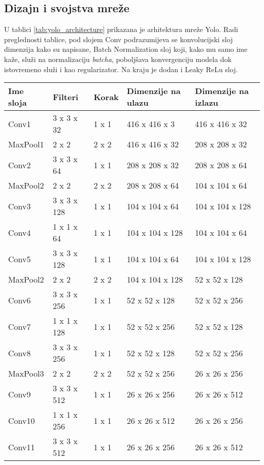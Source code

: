 \subsection{Dizajn i svojstva mreže}

U tablici \ref{tab:yolo_architecture} prikazana je arhitektura mreže Yolo. Radi preglednosti tablice, pod slojem Conv podrazumijeva se konvolucijski sloj dimenzija kako su napisane, Batch Normalization sloj koji, kako mu samo ime kaže, služi na normalizaciju \textit{batcha}, poboljšava konvergenciju modela dok istovremeno služi i kao regularizator. Na kraju je dodan i Leaky ReLu sloj.

\begin{minipage}{\linewidth}
\centering

\begin{tabular}{||l|l|l|l|l||}
\hline
	Ime sloja & Filteri & Korak & Dimenzije na ulazu & Dimenzije na izlazu \\
\hline
	Conv1 & 3 x 3 x 32 & 1 x 1 & 416 x 416 x   3 & 416 x 416 x  32 \\
\hline
	MaxPool1 & 2 x 2 & 2 x 2 & 416 x 416 x  32 & 208 x 208 x  32 \\
\hline
	Conv2 & 3 x 3 x 64 & 1 x 1 & 208 x 208 x  32 & 208 x 208 x  64 \\
\hline
	MaxPool2 & 2 x 2 & 2 x 2 & 208 x 208 x  64 & 104 x 104 x  64 \\
\hline
	Conv3 & 3 x 3 x 128 & 1 x 1 & 104 x 104 x  64 & 104 x 104 x 128 \\
\hline	
	Conv4 & 1 x 1 x 64 & 1 x 1 & 104 x 104 x 128 & 104 x 104 x  64 \\
\hline
	Conv5 & 3 x 3 x 128 & 1 x 1 & 104 x 104 x  64 & 104 x 104 x 128 \\
\hline
	MaxPool2 & 2 x 2 & 2 x 2 & 104 x 104 x 128 & 52 x  52 x 128 \\
\hline
	Conv6 & 3 x 3 x 256 & 1 x 1 & 52 x  52 x 128 & 52 x  52 x 256 \\
\hline
	Conv7 & 1 x 1 x 128 & 1 x 1 & 52 x  52 x 256 & 52 x  52 x 128 \\
\hline
	Conv8 &  3 x 3 x 256 & 1 x 1 & 52 x  52 x 128 & 52 x  52 x 256 \\
\hline
	MaxPool3 & 2 x 2 & 2 x 2 & 52 x  52 x 256 & 26 x  26 x 256 \\
\hline
	Conv9 & 3 x 3 x 512 & 1 x 1 & 26 x  26 x 256 & 26 x  26 x 512 \\
\hline
	Conv10 & 1 x 1 x 256 & 1 x 1 & 26 x  26 x 512 & 26 x  26 x 256 \\
\hline
	Conv11 & 3 x 3 x 512 & 1 x 1 & 26 x  26 x 256 & 26 x  26 x 512\\

\end{tabular}
\end{minipage}

